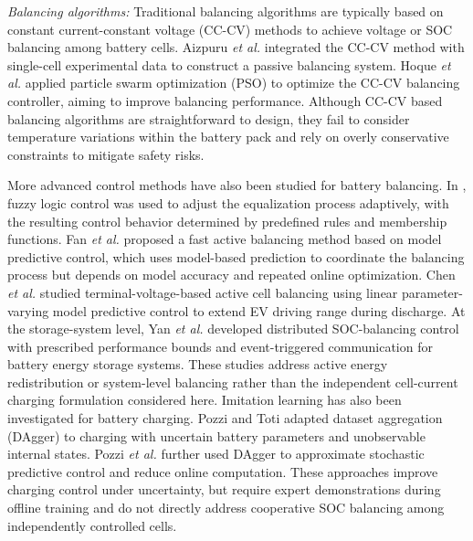 \documentclass[10pt,journal,letterpaper]{IEEEtran}
\newcommand{\newrev}[1]{#1}
\begin{document}
\newrev{\textit{Balancing algorithms:} Traditional balancing algorithms are typically based on constant current-constant voltage (CC-CV) methods to achieve voltage or SOC balancing among battery cells. Aizpuru {\it et al.} \cite{13} integrated the CC-CV method with single-cell experimental data to construct a passive balancing system. Hoque {\it et al.} \cite{14} applied particle swarm optimization (PSO) to optimize the CC-CV balancing controller, aiming to improve balancing performance. Although CC-CV based balancing algorithms are straightforward to design, they fail to consider temperature variations within the battery pack and rely on overly conservative constraints to mitigate safety risks.}

More advanced control methods have also been studied for battery balancing. In \cite{15}, fuzzy logic control was used to adjust the equalization process adaptively, with the resulting control behavior determined by predefined rules and membership functions. Fan {\it et al.} \cite{16} proposed a fast active balancing method based on model predictive control, which uses model-based prediction to coordinate the balancing process but depends on model accuracy and repeated online optimization. Chen {\it et al.} \cite{chen2024balancing} studied terminal-voltage-based active cell balancing using linear parameter-varying model predictive control to extend EV driving range during discharge. At the storage-system level, Yan {\it et al.} \cite{yan2026bess} developed distributed SOC-balancing control with prescribed performance bounds and event-triggered communication for battery energy storage systems. These studies address active energy redistribution or system-level balancing rather than the independent cell-current charging formulation considered here. \newrev{Imitation learning has also been investigated for battery charging. Pozzi and Toti \cite{pozzi2023dagger} adapted dataset aggregation (DAgger) to charging with uncertain battery parameters and unobservable internal states. Pozzi {\it et al.} \cite{pozzi2025stochastic} further used DAgger to approximate stochastic predictive control and reduce online computation. These approaches improve charging control under uncertainty, but require expert demonstrations during offline training and do not directly address cooperative SOC balancing among independently controlled cells.}
\end{document}
